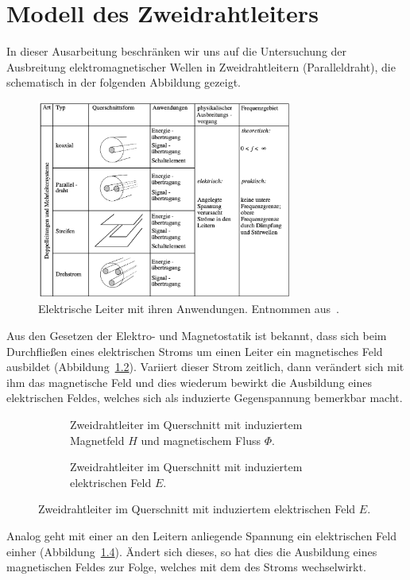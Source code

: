 \documentclass[paper=a4, parskip=half-, ngerman, fontsize=11pt]{scrreprt}
\begin{document}
\chapter{Modell des Zweidrahtleiters}

In dieser Ausarbeitung beschränken wir uns auf die Untersuchung der Ausbreitung elektromagnetischer Wellen in
Zweidrahtleitern (Paralleldraht), die schematisch in der folgenden Abbildung gezeigt.
\begin{figure}[!htb]
    \begin{center}
        \includegraphics[width=0.75\textwidth]{images/Leiter.png}
        \caption{Elektrische Leiter mit ihren Anwendungen. Entnommen aus~\cite{FernuniSkript}.}
        \label{Leiter}
    \end{center}
\end{figure}

Aus den Gesetzen der Elektro- und Magnetostatik ist bekannt, dass sich beim Durchfließen eines elektrischen Stroms um
einen Leiter ein magnetisches Feld ausbildet (Abbildung~\ref{Felder1}). Variiert dieser Strom zeitlich, dann
verändert sich mit ihm das magnetische Feld und dies wiederum bewirkt die Ausbildung eines elektrischen Feldes, welches
sich als induzierte Gegenspannung bemerkbar macht.
\begin{figure}[!htb]
    \begin{subfigure}[t]{0.49\textwidth}
        \centering
        
        \caption{Zweidrahtleiter im Querschnitt mit induziertem Magnetfeld $H$ und magnetischem Fluss $\Phi$.}
        \label{Felder1}
    \end{subfigure}%
    \hfill
    \begin{subfigure}[t]{0.49\textwidth}
        \centering
        
        \caption{Zweidrahtleiter im Querschnitt mit induziertem elektrischen Feld $E$.}
        \label{Felder2}
    \end{subfigure}
\end{figure}
Analog geht mit einer an den Leitern anliegende Spannung ein elektrischen Feld einher (Abbildung~\ref{Felder2}).
Ändert sich dieses, so hat dies die Ausbildung eines magnetischen Feldes zur Folge, welches mit dem des Stroms
wechselwirkt.
\end{document}
